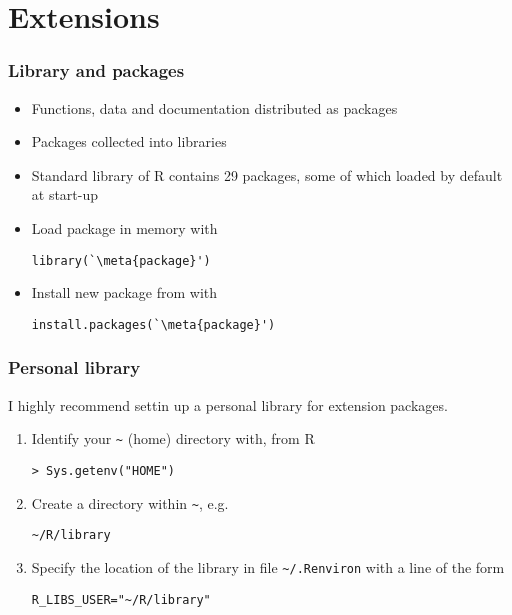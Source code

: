 \section{Extensions}

\begin{frame}[fragile=singleslide]
  \frametitle{Library and packages}

  \begin{itemize}
  \item Functions, data and documentation distributed as \alert{packages}
  \item Packages collected into \alert{libraries}
  \item Standard library of R contains 29 packages, some of which
    loaded by default at start-up
  \item Load package in memory with
    \begin{Schunk}
\begin{lstlisting}
library(`\meta{package}')
\end{lstlisting}
    \end{Schunk}
  \item Install new package from
     with
    \begin{Schunk}
\begin{lstlisting}
install.packages(`\meta{package}')
\end{lstlisting}
    \end{Schunk}
  \end{itemize}
\end{frame}

\begin{frame}[fragile=singleslide]
  \frametitle{Personal library}

  I highly recommend settin up a personal library for extension
  packages.

  \begin{enumerate}
  \item Identify your \verb=~= (\alert{home}) directory with, from R
    \begin{Schunk}
\begin{lstlisting}
> Sys.getenv("HOME")
\end{lstlisting}
    \end{Schunk}
  \item Create a directory within \verb=~=, e.g.
    \begin{Schunk}
\begin{lstlisting}
~/R/library
\end{lstlisting}
    \end{Schunk}
  \item Specify the location of the library in file
    \verb=~/.Renviron= with a line of the form
    \begin{Schunk}
\begin{lstlisting}
R_LIBS_USER="~/R/library"
\end{lstlisting}
    \end{Schunk}
  \end{enumerate}

  \pause
\end{frame}

